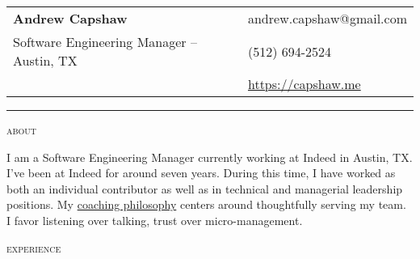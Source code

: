 \documentclass[11pt]{amsart}
\begin{document}
\thispagestyle{empty}

\begin{tabularx}{\textwidth}{@{}Xl@{}}
 \textbf{Andrew Capshaw} & andrew.capshaw@gmail.com \\
 Software Engineering Manager – Austin, TX & (512) 694-2524 \\
& \href{https://capshaw.me}{https://capshaw.me} \\
\end{tabularx}
\bigskip

\bigskip
\hrule depth 0.5pt

\begingroup
\setlength{\tabcolsep}{10pt} %
\renewcommand{\arraystretch}{1.5} %

\bigskip
\textsc{about}

I am a Software Engineering Manager currently working at Indeed in Austin, TX. I've been at Indeed for around seven years. During this time, I have worked as both an individual contributor as well as in technical and managerial leadership positions. My \href{https://capshaw.me/posts/19/}{coaching philosophy} centers around thoughtfully serving my team. I favor listening over talking, trust over micro-management.

\bigskip
\textsc{experience}
\end{document}
